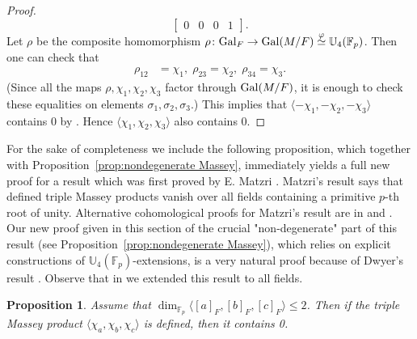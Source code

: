 \documentclass[12pt,leqno]{amsart}
\theoremstyle{plain}
\newtheorem{prop}[thm]{Proposition}
\theoremstyle{definition}
\newcommand{\Gal}{{\rm Gal}}
\newcommand{\F}{{\mathbb F}}
\newcommand{\U}{{\mathbb U}}
\begin{document}
\begin{proof}
\[\begin{bmatrix}
0& 0 & 0 & 1
\end{bmatrix}.
\]
Let $\rho$ be the  composite homomorphism $\rho\colon\Gal_F\to \Gal(M/F)\stackrel{\varphi}{\simeq} \U_4(\F_p)$. Then one can check that
\[
\begin{aligned}
\rho_{12} &=\chi_1,\; \rho_{23}=\chi_2, \; \rho_{34} =\chi_3.
\end{aligned}
\]
(Since  all the maps $\rho,\chi_1,\chi_2,\chi_3$ factor through $\Gal(M/F)$, it is enough to check these equalities on elements  $\sigma_1,\sigma_2,\sigma_3$.) 
This implies that $\langle -\chi_1,-\chi_2,-\chi_3\rangle$ contains 0 by \cite[Theorem 2.4]{Dwy}. Hence $\langle \chi_1,\chi_2,\chi_3\rangle$ also contains 0.
\end{proof}

For the sake of completeness we include the following proposition, which together with Proposition~\ref{prop:nondegenerate Massey}, immediately yields a full new proof for a result which was first proved by E. Matzri \cite{Ma}. Matzri's result says  that defined triple Massey products vanish over all fields containing a primitive $p$-th root of unity. 
Alternative cohomological 
proofs for Matzri's result are in \cite{EMa2} and \cite{MT5}. Our new proof given in this section of the crucial "non-degenerate" part of this result (see Proposition~\ref{prop:nondegenerate Massey}),  which relies on explicit constructions of $\U_4 (\F_p)$-extensions, is a very natural proof because of Dwyer's result \cite[Theorem 2.4]{Dwy}. 
Observe that in \cite{MT5} we extended this result to all fields. 
\begin{prop}
\label{prop:degenerate Massey}
Assume that $\dim_{\F_p}\langle [a]_F,[b]_F,[c]_F\rangle\leq 2$. Then if the triple Massey product $\langle \chi_a,\chi_b,\chi_c\rangle$ is defined, then it contains 0.
\end{prop}
\end{document}
